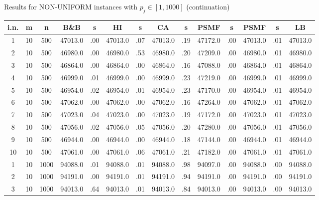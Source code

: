 \documentclass[12pt,a4paper]{article}
\begin{document}
\begin{center}
{\footnotesize  Results for NON-UNIFORM instances with $p_j \in
[1,1000]$ (continuation)} {\tiny
\begin{tabular}{|ccc|cc|cc|cc|cc|cc|c|}\hline
{\bf i.n.}&{\bf m}&{\bf n}&{\bf B\&B}&{\bf s}&{\bf HI}&{\bf s}&{\bf
CA}&{\bf s}&{\bf PSMF}&{\bf s}&{\bf PSMF}&{\bf s}&{\bf LB}
\\\hline

1             &  10& 500&  47013.0&  .00&  47013.0&  .07&  47013.0&  .19&  47172.0&  .00&  47013.0&  .01&  47013.0\\[-0.01in]
2             &  10& 500&  46980.0&  .00&  46980.0&  .53&  46980.0&  .20&  47209.0&  .00&  46980.0&  .01&  46980.0\\[-0.01in]
3             &  10& 500&  46864.0&  .00&  46864.0&  .00&  46864.0&  .16&  47088.0&  .00&  46864.0&  .01&  46864.0\\[-0.01in]
4             &  10& 500&  46999.0&  .01&  46999.0&  .00&  46999.0&  .23&  47219.0&  .00&  46999.0&  .01&  46999.0\\[-0.01in]
5             &  10& 500&  46954.0&  .02&  46954.0&  .01&  46954.0&  .23&  47170.0&  .00&  46954.0&  .01&  46954.0\\[-0.01in]
6             &  10& 500&  47062.0&  .00&  47062.0&  .00&  47062.0&  .16&  47264.0&  .00&  47062.0&  .01&  47062.0\\[-0.01in]
7             &  10& 500&  47023.0&  .04&  47023.0&  .00&  47023.0&  .19&  47172.0&  .00&  47023.0&  .01&  47023.0\\[-0.01in]
8             &  10& 500&  47056.0&  .02&  47056.0&  .05&  47056.0&  .20&  47280.0&  .00&  47056.0&  .01&  47056.0\\[-0.01in]
9             &  10& 500&  46944.0&  .00&  46944.0&  .00&  46944.0&  .18&  47144.0&  .00&  46944.0&  .01&  46944.0\\[-0.01in]
10            &  10& 500&  47061.0&  .00&  47061.0&  .06&  47061.0&  .21&  47182.0&  .00&  47061.0&  .01&  47061.0\\[-0.01in]
1             &  10&1000&  94088.0&  .01&  94088.0&  .01&  94088.0&  .98&  94097.0&  .00&  94088.0&  .00&  94088.0\\[-0.01in]
2             &  10&1000&  94191.0&  .00&  94191.0&  .01&  94191.0&  .94&  94191.0&  .00&  94191.0&  .00&  94191.0\\[-0.01in]
3             &  10&1000&  94013.0&  .64&  94013.0&  .01&  94013.0&  .84&  94013.0&  .00&  94013.0&  .00&  94013.0\\[-0.01in]

\end{tabular}}
\end{center}
\end{document}
